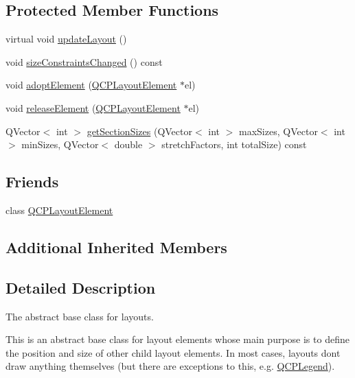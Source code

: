 \subsection*{Protected Member Functions}
\begin{DoxyCompactItemize}
\item 
virtual void \hyperlink{classQCPLayout_a165c77f6287ac92e8d03017ad913378b}{update\+Layout} ()
\item 
void \hyperlink{classQCPLayout_a6218cd7e5c0e30077c1aeaffe55b6145}{size\+Constraints\+Changed} () const 
\item 
void \hyperlink{classQCPLayout_af6dbbc24156a808da29cd1ec031729a3}{adopt\+Element} (\hyperlink{classQCPLayoutElement}{Q\+C\+P\+Layout\+Element} $\ast$el)
\item 
void \hyperlink{classQCPLayout_a4afbb4bef0071f72f91afdac4433a18e}{release\+Element} (\hyperlink{classQCPLayoutElement}{Q\+C\+P\+Layout\+Element} $\ast$el)
\item 
Q\+Vector$<$ int $>$ \hyperlink{classQCPLayout_a92d9dcd95e9510b323706ef7fc4ff62e}{get\+Section\+Sizes} (Q\+Vector$<$ int $>$ max\+Sizes, Q\+Vector$<$ int $>$ min\+Sizes, Q\+Vector$<$ double $>$ stretch\+Factors, int total\+Size) const 
\end{DoxyCompactItemize}
\subsection*{Friends}
\begin{DoxyCompactItemize}
\item 
class \hyperlink{classQCPLayout_a0790750c7e7f14fdbd960d172655b42b}{Q\+C\+P\+Layout\+Element}
\end{DoxyCompactItemize}
\subsection*{Additional Inherited Members}


\subsection{Detailed Description}
The abstract base class for layouts. 

This is an abstract base class for layout elements whose main purpose is to define the position and size of other child layout elements. In most cases, layouts don\textquotesingle{}t draw anything themselves (but there are exceptions to this, e.\+g. \hyperlink{classQCPLegend}{Q\+C\+P\+Legend}).

